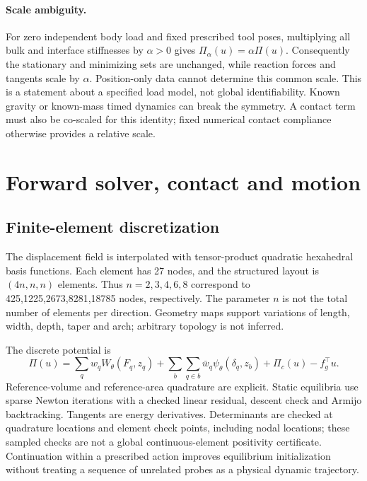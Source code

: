 \documentclass[10pt,twocolumn,letterpaper]{article}
\begin{document}
\paragraph{Scale ambiguity.}
For zero independent body load and fixed prescribed tool poses, multiplying all bulk and interface stiffnesses by $\alpha>0$ gives $\Pi_\alpha(u)=\alpha\Pi(u)$. Consequently the stationary and minimizing sets are unchanged, while reaction forces and tangents scale by $\alpha$. Position-only data cannot determine this common scale. This is a statement about a specified load model, not global identifiability. Known gravity or known-mass timed dynamics can break the symmetry. A contact term must also be co-scaled for this identity; fixed numerical contact compliance otherwise provides a relative scale.

\section{Forward solver, contact and motion}
\subsection{Finite-element discretization}
The displacement field is interpolated with tensor-product quadratic hexahedral basis functions. Each element has 27 nodes, and the structured layout is $(4n,n,n)$ elements. Thus $n=2,3,4,6,8$ correspond to 425,1225,2673,8281,18785 nodes, respectively. The parameter $n$ is not the total number of elements per direction. Geometry maps support variations of length, width, depth, taper and arch; arbitrary topology is not inferred.

The discrete potential is
\begin{equation}
 \Pi(u)=\sum_q w_q W_\theta(F_q,z_q)+\sum_b\sum_{q\in b}\bar w_q\psi_\theta(\delta_q,z_b)+\Pi_c(u)-f_g^\top u.
\end{equation}
Reference-volume and reference-area quadrature are explicit. Static equilibria use sparse Newton iterations with a checked linear residual, descent check and Armijo backtracking. Tangents are energy derivatives. Determinants are checked at quadrature locations and element check points, including nodal locations; these sampled checks are not a global continuous-element positivity certificate. Continuation within a prescribed action improves equilibrium initialization without treating a sequence of unrelated probes as a physical dynamic trajectory.
\end{document}
